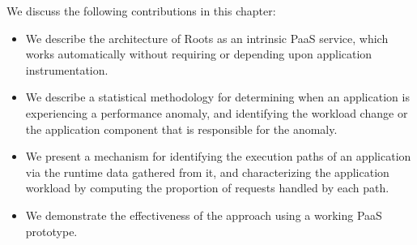 We discuss the following contributions in this chapter:
\begin{itemize}
\item We describe the architecture of Roots as an intrinsic PaaS
service, which works automatically without requiring or depending upon
application instrumentation.
\item We describe a statistical methodology for determining when an
application is experiencing a performance anomaly, and identifying the 
workload change or the application component that is responsible for the anomaly.
\item We present a mechanism for identifying the execution paths of an
application via the runtime data gathered from it, and characterizing
the application workload by computing the proportion of requests handled 
by each path.
\item We demonstrate the effectiveness of the approach using a working PaaS
prototype.
\end{itemize}